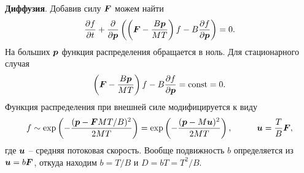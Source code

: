 \textbf{Диффузия}. Добавив силу $\boldsymbol{F}$ можем найти
\begin{equation*}
	\frac{\partial f}{\partial t} + \frac{\partial }{\partial \boldsymbol{p}} \left(
		\left(\boldsymbol{F} - \frac{B \boldsymbol{p}}{MT}\right) f - B \frac{\partial f}{\partial \boldsymbol{p}} 
	\right) = 0.
\end{equation*}
На больших $\boldsymbol{p}$ функция распределения обращается в ноль. Для стационарного случая
\begin{equation*}
	\left(\boldsymbol{F} - \frac{B \boldsymbol{p}}{MT}\right) f - B \frac{\partial f}{\partial \boldsymbol{p}}  = \textnormal{const} = 0.
\end{equation*}
Функция распределения при внешней силе модифицируется к виду
\begin{equation*}
	f \sim \exp\left(
		- \frac{(\vc{p} - \vc{F} M T/B)^2}{2MT}
	\right) = \exp\left(
		- \frac{(\vc{p} - M \vc{u})^2}{2MT}
	\right),
	\hspace{10 mm} 
	\vc{u} = \frac{T}{B} \vc{F},
\end{equation*}
где $\boldsymbol{u}$ -- средняя потоковая скорость. Вообще подвижность $b$ определяется из $\boldsymbol{u} = b \boldsymbol{F}$, откуда находим $b = T/B$ и $D = b T = T^2/B$.


